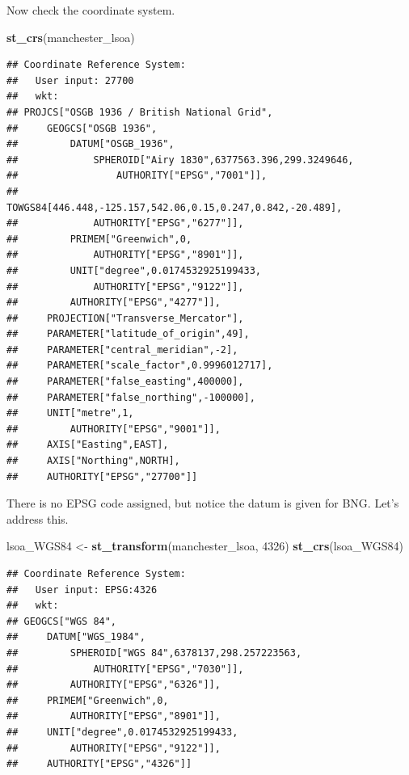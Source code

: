 \documentclass[]{book}
\newenvironment{Shaded}{\begin{snugshade}}{\end{snugshade}}
\newcommand{\DecValTok}[1]{\textcolor[rgb]{0.00,0.00,0.81}{#1}}
\newcommand{\KeywordTok}[1]{\textcolor[rgb]{0.13,0.29,0.53}{\textbf{#1}}}
\newcommand{\NormalTok}[1]{#1}
\newcommand{\StringTok}[1]{\textcolor[rgb]{0.31,0.60,0.02}{#1}}
\begin{document}
Now check the coordinate system.

\begin{Shaded}
\begin{Highlighting}[]
\KeywordTok{st_crs}\NormalTok{(manchester_lsoa)}
\end{Highlighting}
\end{Shaded}

\begin{verbatim}
## Coordinate Reference System:
##   User input: 27700 
##   wkt:
## PROJCS["OSGB 1936 / British National Grid",
##     GEOGCS["OSGB 1936",
##         DATUM["OSGB_1936",
##             SPHEROID["Airy 1830",6377563.396,299.3249646,
##                 AUTHORITY["EPSG","7001"]],
##             TOWGS84[446.448,-125.157,542.06,0.15,0.247,0.842,-20.489],
##             AUTHORITY["EPSG","6277"]],
##         PRIMEM["Greenwich",0,
##             AUTHORITY["EPSG","8901"]],
##         UNIT["degree",0.0174532925199433,
##             AUTHORITY["EPSG","9122"]],
##         AUTHORITY["EPSG","4277"]],
##     PROJECTION["Transverse_Mercator"],
##     PARAMETER["latitude_of_origin",49],
##     PARAMETER["central_meridian",-2],
##     PARAMETER["scale_factor",0.9996012717],
##     PARAMETER["false_easting",400000],
##     PARAMETER["false_northing",-100000],
##     UNIT["metre",1,
##         AUTHORITY["EPSG","9001"]],
##     AXIS["Easting",EAST],
##     AXIS["Northing",NORTH],
##     AUTHORITY["EPSG","27700"]]
\end{verbatim}

There is no EPSG code assigned, but notice the datum is given for BNG. Let's address this.

\begin{Shaded}
\begin{Highlighting}[]
\NormalTok{lsoa_WGS84 <-}\StringTok{ }\KeywordTok{st_transform}\NormalTok{(manchester_lsoa, }\DecValTok{4326}\NormalTok{)}
\KeywordTok{st_crs}\NormalTok{(lsoa_WGS84)}
\end{Highlighting}
\end{Shaded}

\begin{verbatim}
## Coordinate Reference System:
##   User input: EPSG:4326 
##   wkt:
## GEOGCS["WGS 84",
##     DATUM["WGS_1984",
##         SPHEROID["WGS 84",6378137,298.257223563,
##             AUTHORITY["EPSG","7030"]],
##         AUTHORITY["EPSG","6326"]],
##     PRIMEM["Greenwich",0,
##         AUTHORITY["EPSG","8901"]],
##     UNIT["degree",0.0174532925199433,
##         AUTHORITY["EPSG","9122"]],
##     AUTHORITY["EPSG","4326"]]
\end{verbatim}
\end{document}

